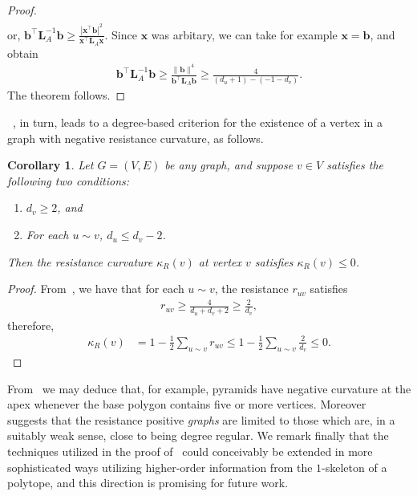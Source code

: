 \documentclass[11pt,a4paper]{amsart}
\newcommand{\resistance}[1]{\kappa_R\left({#1}\right)}
\newtheorem{corollary}[theorem]{Corollary}
\begin{document}
\begin{proof}
\begin{align*}
        \end{align*}
    or, $\mathbf{b}^\top \mathbf{L}_A^{-1} \mathbf{b} \geq \frac{|\mathbf{x}^\top \mathbf{b}|^2}{\mathbf{x}^\top \mathbf{L}_A\mathbf{x}}$. Since $\mathbf{x}$ was arbitary, we can take for example $\mathbf{x}=\mathbf{b}$, and obtain
        \begin{align*}
            \mathbf{b}^\top \mathbf{L}_A ^{-1} \mathbf{b} \geq \frac{\|\mathbf{b}\|^4}{\mathbf{b}^\top \mathbf{L}_A \mathbf{b}}\geq \frac{4}{(d_u+1)-(-1-d_v)}.
        \end{align*}
    The theorem follows.
\end{proof}

~, in turn, leads to a degree-based criterion for the existence of a vertex in a graph with negative resistance curvature, as follows.

\begin{corollary}\label{cor:resistance-curv-lowerbound}
    Let $G=(V,E)$ be any graph, and suppose $v\in V$ satisfies the following two conditions:
        \begin{enumerate}[label={\normalfont (\roman*)}]
            \item $d_v\geq 2$, and
            \item For each $u\sim v$, $d_u\leq d_v -2$.
        \end{enumerate}
    Then the resistance curvature $\resistance{v}$ at vertex $v$ satisfies $\resistance{v}\leq 0$.
\end{corollary}

\begin{proof}
    From~, we have that for each $u\sim v$, the resistance $r_{uv}$ satisfies
        \begin{align*}
            r_{uv} \geq \frac{4}{d_u + d_v + 2} \geq \frac{2}{d_v},
        \end{align*}
    therefore,
        \begin{align*}
            \resistance{v} &= 1-\frac{1}{2}\sum_{u\sim v}r_{uv} \leq 1-\frac{1}{2}\sum_{u\sim v}\frac{2}{d_v} \leq 0.
        \end{align*}
\end{proof}

From~ we may deduce that, for example, pyramids have negative curvature at the apex whenever the base polygon contains five or more vertices. Moreover~ suggests that the resistance positive \emph{graphs} are limited to those which are, in a suitably weak sense, close to being degree regular. We remark finally that the techniques utilized in the proof of~ could conceivably be extended in more sophisticated ways utilizing higher-order information from the $1$-skeleton of a polytope, and this direction is promising for future work. 
\end{document}
